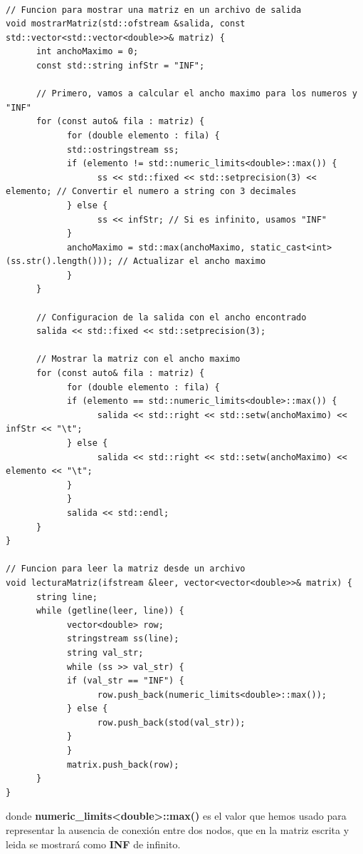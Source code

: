 \documentclass[11pt,openany]{book}
\begin{document}
\begin{lstlisting}

// Funcion para mostrar una matriz en un archivo de salida
void mostrarMatriz(std::ofstream &salida, const std::vector<std::vector<double>>& matriz) {
      int anchoMaximo = 0;
      const std::string infStr = "INF";

      // Primero, vamos a calcular el ancho maximo para los numeros y "INF"
      for (const auto& fila : matriz) {
            for (double elemento : fila) {
            std::ostringstream ss;
            if (elemento != std::numeric_limits<double>::max()) {
                  ss << std::fixed << std::setprecision(3) << elemento; // Convertir el numero a string con 3 decimales
            } else {
                  ss << infStr; // Si es infinito, usamos "INF"
            }
            anchoMaximo = std::max(anchoMaximo, static_cast<int>(ss.str().length())); // Actualizar el ancho maximo
            }
      }

      // Configuracion de la salida con el ancho encontrado
      salida << std::fixed << std::setprecision(3);

      // Mostrar la matriz con el ancho maximo
      for (const auto& fila : matriz) {
            for (double elemento : fila) {
            if (elemento == std::numeric_limits<double>::max()) {
                  salida << std::right << std::setw(anchoMaximo) << infStr << "\t";
            } else {
                  salida << std::right << std::setw(anchoMaximo) << elemento << "\t";
            }
            }
            salida << std::endl;
      }
}
      
// Funcion para leer la matriz desde un archivo
void lecturaMatriz(ifstream &leer, vector<vector<double>>& matrix) {
      string line;
      while (getline(leer, line)) {
            vector<double> row;
            stringstream ss(line);
            string val_str;
            while (ss >> val_str) {
            if (val_str == "INF") {
                  row.push_back(numeric_limits<double>::max());
            } else {
                  row.push_back(stod(val_str));
            }
            }
            matrix.push_back(row);
      }
}
\end{lstlisting}
donde \textbf{numeric\_limits<double>::max()} es el valor que hemos usado para representar la ausencia de conexión entre dos nodos, que
en la matriz escrita y leida se mostrará como \textbf{INF} de infinito.\\ \\
\end{document}

